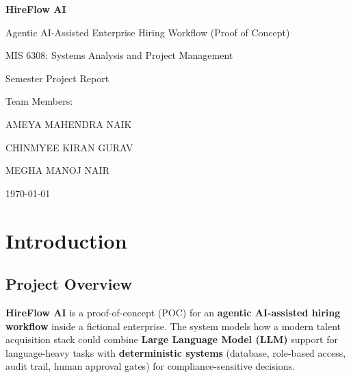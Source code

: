 \documentclass[12pt]{article}
\begin{document}
\begin{titlepage}
    \centering
    \vspace*{1.5cm}

    {\Huge \textbf{HireFlow AI}\par}
    \vspace{0.5cm}

    {\Large Agentic AI-Assisted Enterprise Hiring Workflow (Proof of Concept)\par}
    \vspace{1.5cm}

    {\large MIS 6308: Systems Analysis and Project Management\par}
    \vspace{0.5cm}

    {\large Semester Project Report\par}
    \vspace{2cm}

    {\large Team Members:\par}
    \vspace{0.3cm}
    {\large AMEYA MAHENDRA NAIK\par}
    {\large CHINMYEE KIRAN GURAV\par}
    {\large MEGHA MANOJ NAIR\par}

    \vfill

    {\large \today\par}
\end{titlepage}

\tableofcontents
\newpage

\section{Introduction}

\subsection{Project Overview}

\textbf{HireFlow AI} is a proof-of-concept (POC) for an \textbf{agentic AI-assisted hiring workflow} inside a fictional enterprise. The system models how a modern talent acquisition stack could combine \textbf{Large Language Model (LLM)} support for language-heavy tasks with \textbf{deterministic systems} (database, role-based access, audit trail, human approval gates) for compliance-sensitive decisions.
\end{document}
